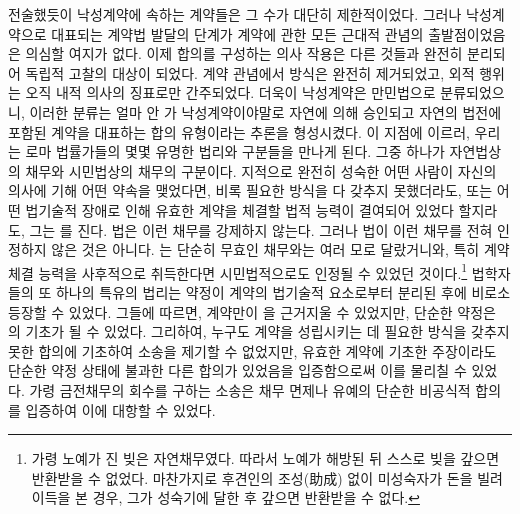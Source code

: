 전술했듯이 낙성계약에 속하는 계약들은 그 수가 대단히 제한적이었다.
그러나
낙성계약으로 대표되는 계약법 발달의 단계가
계약에 관한 모든 근대적 관념의 출발점이었음은 의심할 여지가 없다.
이제 합의를 구성하는 의사 작용은
다른 것들과 완전히 분리되어 독립적 고찰의 대상이 되었다.
계약 관념에서 방식은 완전히 제거되었고,
외적 행위는 오직 내적 의사의 징표로만 간주되었다.
더욱이 낙성계약은 만민법으로 분류되었으니,
이러한 분류는
얼마 안 가
낙성계약이야말로
자연에 의해 승인되고 자연의 법전에 포함된
계약을 대표하는 합의 유형이라는 추론을 형성시켰다.
이 지점에 이르러, 우리는
로마 법률가들의 몇몇 유명한 법리와 구분들을 만나게 된다.
그중 하나가 자연법상의 채무와
시민법상의 채무의 구분이다.
지적으로 완전히 성숙한 어떤 사람이
자신의 의사에 기해
어떤 약속을 맺었다면,
비록 필요한 방식을 다 갖추지 못했더라도,
또는 어떤 법기술적 장애로 인해
유효한 계약을 체결할 법적 능력이 결여되어 있었다 할지라도,
그는 를 진다.
법은
이런 채무를 강제하지 않는다.
그러나 법이 이런 채무를 전혀 인정하지 않은 것은 아니다.
는
단순히 무효인 채무와는 여러 모로 달랐거니와,
특히 계약 체결 능력을 사후적으로 취득한다면
시민법적으로도 인정될 수 있었던 것이다.\footnote{%
  가령 노예가 진 빚은 자연채무였다. 따라서 노예가 해방된 뒤
  스스로 빚을 갚으면 반환받을 수 없었다.
  마찬가지로 후견인의 조성(助成) 없이 미성숙자가 돈을 빌려 이득을 본 경우,
  그가 성숙기에 달한 후 갚으면 반환받을 수 없다.
  }
법학자들의 또 하나의 특유의 법리는 약정이
계약의 법기술적 요소로부터 분리된 후에 비로소 등장할 수 있었다.
그들에 따르면,
계약만이 을 근거지울 수 있었지만,
단순한 약정은 의 기초가 될 수 있었다.
그리하여,
누구도
계약을 성립시키는 데 필요한
방식을 갖추지 못한
합의에 기초하여 소송을 제기할 수 없었지만,
유효한 계약에 기초한 주장이라도
단순한 약정 상태에 불과한 다른 합의가 있었음을 입증함으로써
이를 물리칠 수 있었다.
가령 금전채무의 회수를 구하는 소송은
채무 면제나 유예의
단순한 비공식적 합의를 입증하여 이에 대항할 수 있었다.

